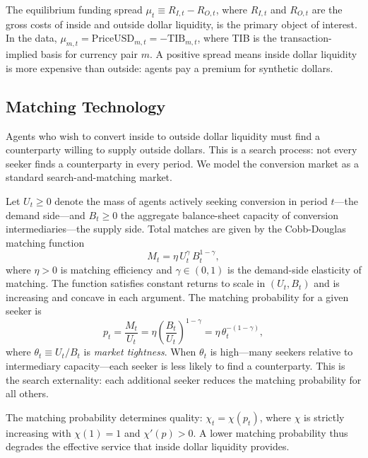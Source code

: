 The equilibrium funding spread $\mu_t \equiv R_{I,t} - R_{O,t}$, where $R_{I,t}$
and $R_{O,t}$ are the gross costs of inside and outside dollar liquidity, is the
primary object of interest. In the data, $\mu_{m,t} = \text{PriceUSD}_{m,t} =
-\text{TIB}_{m,t}$, where TIB is the transaction-implied basis for currency pair
$m$. A positive spread means inside dollar liquidity is more expensive than
outside: agents pay a premium for synthetic dollars.


\subsection{Matching Technology}
\label{subsec:matching}

Agents who wish to convert inside to outside dollar liquidity must find a
counterparty willing to supply outside dollars. This is a search process: not
every seeker finds a counterparty in every period. We model the conversion market
as a standard search-and-matching market.

Let $U_t \geq 0$ denote the mass of agents actively seeking conversion in period
$t$---the demand side---and $B_t \geq 0$ the aggregate balance-sheet capacity
of conversion intermediaries---the supply side. Total matches are given by the
Cobb-Douglas matching function
\begin{equation}
  M_t = \eta\, U_t^{\gamma}\, B_t^{1-\gamma},
  \label{eq:matching}
\end{equation}
where $\eta > 0$ is matching efficiency and $\gamma \in (0,1)$ is the
demand-side elasticity of matching. The function satisfies constant returns to
scale in $(U_t, B_t)$ and is increasing and concave in each argument. The
matching probability for a given seeker is
\begin{equation}
  p_t = \frac{M_t}{U_t} = \eta \left(\frac{B_t}{U_t}\right)^{1-\gamma}
  = \eta\,\theta_t^{-(1-\gamma)},
  \label{eq:match-prob}
\end{equation}
where $\theta_t \equiv U_t / B_t$ is \emph{market tightness}. When $\theta_t$
is high---many seekers relative to intermediary capacity---each seeker is less
likely to find a counterparty. This is the search externality: each additional
seeker reduces the matching probability for all others.

The matching probability determines quality: $\chi_t = \chi(p_t)$, where $\chi$
is strictly increasing with $\chi(1) = 1$ and $\chi'(p) > 0$. A lower
matching probability thus degrades the effective service that inside dollar
liquidity provides.

